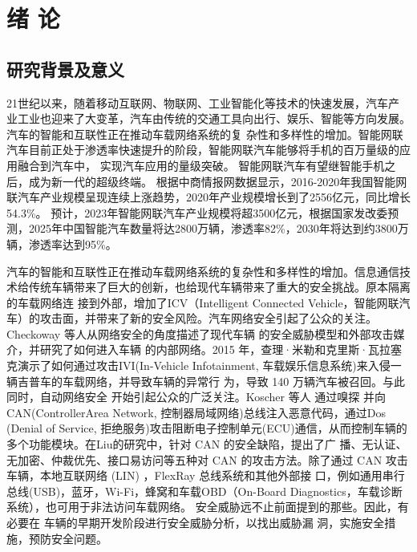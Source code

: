 \chapter{绪\hskip 0.4cm 论}
\label{ch1}
\section{研究背景及意义}
21世纪以来，随着移动互联网、物联网、工业智能化等技术的快速发展，汽车产
业工业也迎来了大变革，汽车由传统的交通工具向出行、娱乐、智能等方向发展。汽车的智能和互联性正在推动车载网络系统的复
杂性和多样性的增加。智能网联汽车目前正处于渗透率快速提升的阶段，智能网联汽车能够将手机的百万量级的应用融合到汽车中，
实现汽车应用的量级突破。
智能网联汽车有望继智能手机之后，成为新一代的超级终端。
根据中商情报网数据显示\cite{zhao}，2016-2020年我国智能网联汽车产业规模呈现连续上涨趋势，2020年产业规模增长到了2556亿元，同比增长54.3\%。
预计，2023年智能网联汽车产业规模将超3500亿元，根据国家发改委预测\cite{siweicaijin}，2025年中国智能汽车数量将达2800万辆，渗透率82\%，2030年将达到约3800万辆，渗透率达到95\%。

汽车的智能和互联性正在推动车载网络系统的复杂性和多样性的增加。信息通信技术给传统车辆带来了巨大的创新，也给现代车辆带来了重大的安全挑战。原本隔离的车载网络连
接到外部，增加了ICV（Intelligent Connected Vehicle，智能网联汽车）的攻击面，并带来了新的安全风险。汽车网络安全引起了公众的关注。
Checkoway 等人\cite{checkoway2011comprehensive}从网络安全的角度描述了现代车辆
的安全威胁模型和外部攻击媒介，并研究了如何进入车辆
的内部网络。2015 年，查理·米勒和克里斯·瓦拉塞克演示了如何通过攻击IVI(In-Vehicle Infotainment, 车载娱乐信息系统)来入侵一辆吉普车的车载网络，并导致车辆的异常行
为，导致 140 万辆汽车被召回。与此同时，自动网络安全
开始引起公众的广泛关注\cite{miller2015remote}。Koscher 等人 \cite{koscher2010experimental} 通过嗅探
并向CAN(ControllerArea Network, 控制器局域网络)总线注入恶意代码，通过Dos
(Denial of Service, 拒绝服务)攻击阻断电子控制单元(ECU)通信，从而控制车辆的
多个功能模块。在Liu的研究\cite{liu2017vehicle}中，针对 CAN 的安全缺陷，提出了广
播、无认证、无加密、仲裁优先、接口易访问等五种对
CAN 的攻击方法。除了通过 CAN 攻击车辆，本地互联网络
(LIN) \cite{deng2017security}，FlexRay \cite{takahashi2017automotive} \cite{gu2016security} 总线系统和其他外部接
口，例如通用串行总线(USB)，蓝牙，Wi-Fi，蜂窝和车载OBD（On-Board Diagnostics，车载诊断系统），也可用于非法访问车载网络\cite{mousa2016lightweight}。
安全威胁远不止前面提到的那些。因此，有必要在
车辆的早期开发阶段进行安全威胁分析，以找出威胁漏
洞，实施安全措施，预防安全问题。

